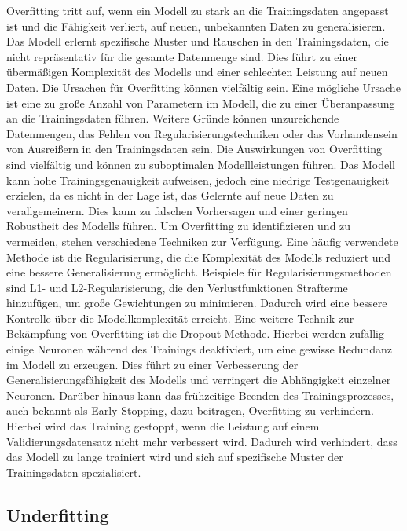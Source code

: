     Overfitting tritt auf, wenn ein Modell zu stark an die Trainingsdaten angepasst ist und die Fähigkeit verliert, auf neuen, unbekannten Daten zu generalisieren. Das Modell erlernt spezifische Muster und Rauschen in den Trainingsdaten, die nicht repräsentativ für die gesamte Datenmenge sind. Dies führt zu einer übermäßigen Komplexität des Modells und einer schlechten Leistung auf neuen Daten.
    Die Ursachen für Overfitting können vielfältig sein. Eine mögliche Ursache ist eine zu große Anzahl von Parametern im Modell, die zu einer Überanpassung an die Trainingsdaten führen. Weitere Gründe können unzureichende Datenmengen, das Fehlen von Regularisierungstechniken oder das Vorhandensein von Ausreißern in den Trainingsdaten sein.
    Die Auswirkungen von Overfitting sind vielfältig und können zu suboptimalen Modellleistungen führen. Das Modell kann hohe Trainingsgenauigkeit aufweisen, jedoch eine niedrige Testgenauigkeit erzielen, da es nicht in der Lage ist, das Gelernte auf neue Daten zu verallgemeinern. Dies kann zu falschen Vorhersagen und einer geringen Robustheit des Modells führen.
    Um Overfitting zu identifizieren und zu vermeiden, stehen verschiedene Techniken zur Verfügung. Eine häufig verwendete Methode ist die Regularisierung, die die Komplexität des Modells reduziert und eine bessere Generalisierung ermöglicht. Beispiele für Regularisierungsmethoden sind L1- und L2-Regularisierung, die den Verlustfunktionen Strafterme hinzufügen, um große Gewichtungen zu minimieren. Dadurch wird eine bessere Kontrolle über die Modellkomplexität erreicht.
    Eine weitere Technik zur Bekämpfung von Overfitting ist die Dropout-Methode. Hierbei werden zufällig einige Neuronen während des Trainings deaktiviert, um eine gewisse Redundanz im Modell zu erzeugen. Dies führt zu einer Verbesserung der Generalisierungsfähigkeit des Modells und verringert die Abhängigkeit einzelner Neuronen.
    Darüber hinaus kann das frühzeitige Beenden des Trainingsprozesses, auch bekannt als Early Stopping, dazu beitragen, Overfitting zu verhindern. Hierbei wird das Training gestoppt, wenn die Leistung auf einem Validierungsdatensatz nicht mehr verbessert wird. Dadurch wird verhindert, dass das Modell zu lange trainiert wird und sich auf spezifische Muster der Trainingsdaten spezialisiert.

\subsection{Underfitting}

